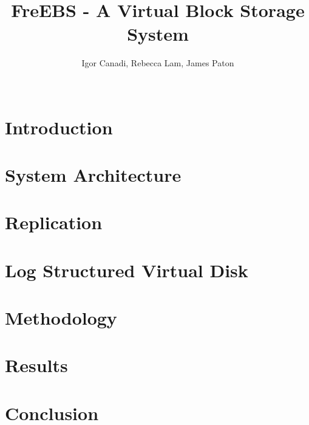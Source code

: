 \documentclass{sig-alternate-10pt}
\begin{document}
\title{FreEBS - A Virtual Block Storage System}

\author{
	\alignauthor Igor Canadi, Rebecca Lam, James Paton\\
	\\
}

\maketitle



\section{Introduction}
\label{sec:intro}


\section{System Architecture}
\label{sec:architecture}


\section{Replication}
\label{sec:replication}


\section{Log Structured Virtual Disk}
\label{sec:lsvd}


\section{Methodology}
\label{sec:method}


\section{Results}
\label{sec:results}


\section{Conclusion}
\label{sec:conc}




\end{document}
